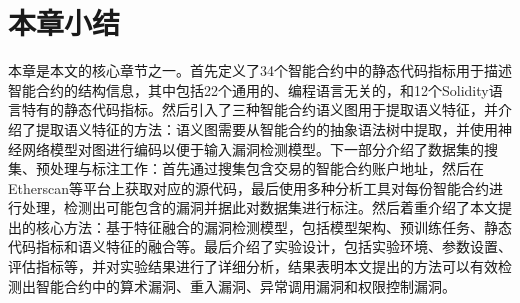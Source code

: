 

\section{本章小结}
\label{sec:本章小结3}
本章是本文的核心章节之一。首先定义了34个智能合约中的静态代码指标用于描述智能合约的结构信息，其中包括22个通用的、编程语言无关的，和12个Solidity语言特有的静态代码指标。然后引入了三种智能合约语义图用于提取语义特征，并介绍了提取语义特征的方法：语义图需要从智能合约的抽象语法树中提取，并使用神经网络模型对图进行编码以便于输入漏洞检测模型。下一部分介绍了数据集的搜集、预处理与标注工作：首先通过搜集包含交易的智能合约账户地址，然后在Etherscan等平台上获取对应的源代码，最后使用多种分析工具对每份智能合约进行处理，检测出可能包含的漏洞并据此对数据集进行标注。然后着重介绍了本文提出的核心方法：基于特征融合的漏洞检测模型，包括模型架构、预训练任务、静态代码指标和语义特征的融合等。最后介绍了实验设计，包括实验环境、参数设置、评估指标等，并对实验结果进行了详细分析，结果表明本文提出的方法可以有效检测出智能合约中的算术漏洞、重入漏洞、异常调用漏洞和权限控制漏洞。